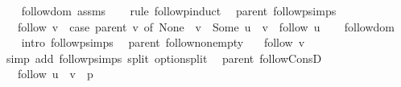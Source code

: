 \begin{isabellebody}
%
\isadelimproof
\ \ %
\endisadelimproof
%
\isatagproof
{}\isamarkupfalse%
\ follow{\isacharunderscore}{\kern0pt}dom\ assms\isanewline
\ \ \isamarkupfalse%
\ {\isacharparenleft}{\kern0pt}rule\ follow{\isachardot}{\kern0pt}pinduct{\isacharparenright}{\kern0pt}%
\endisatagproof
{\isafoldproof}%
%
\isadelimproof
\isanewline
%
\endisadelimproof
\isanewline
{}\isamarkupfalse%
\ {\isacharparenleft}{\kern0pt}\ parent{\isacharparenright}{\kern0pt}\ follow{\isacharunderscore}{\kern0pt}psimps{\isacharcolon}{\kern0pt}\isanewline
\ \ \ {\isachardoublequoteopen}follow\ v\ {\isacharequal}{\kern0pt}\ {\isacharparenleft}{\kern0pt}case\ parent\ v\ of\ None\ {\isasymRightarrow}\ {\isacharbrackleft}{\kern0pt}v{\isacharbrackright}{\kern0pt}\ {\isacharbar}{\kern0pt}\ Some\ u\ {\isasymRightarrow}\ v\ {\isacharhash}{\kern0pt}\ follow\ u{\isacharparenright}{\kern0pt}{\isachardoublequoteclose}\isanewline
%
\isadelimproof
\ \ %
\endisadelimproof
%
\isatagproof
{}\isamarkupfalse%
\ follow{\isacharunderscore}{\kern0pt}dom\isanewline
\ \ \isamarkupfalse%
\ {\isacharparenleft}{\kern0pt}intro\ follow{\isachardot}{\kern0pt}psimps{\isacharparenright}{\kern0pt}%
\endisatagproof
{\isafoldproof}%
%
\isadelimproof
%
\endisadelimproof
%
\isadelimdocument
%
\endisadelimdocument
%
\isatagdocument
%
\isamarkupsubsection{%
}
\isamarkuptrue%
%
\endisatagdocument
{\isafolddocument}%
%
\isadelimdocument
%
\endisadelimdocument
{}\isamarkupfalse%
\ {\isacharparenleft}{\kern0pt}\ parent{\isacharparenright}{\kern0pt}\ follow{\isacharunderscore}{\kern0pt}non{\isacharunderscore}{\kern0pt}empty{\isacharcolon}{\kern0pt}\isanewline
\ \ \ {\isachardoublequoteopen}follow\ v\ {\isasymnoteq}\ {\isacharbrackleft}{\kern0pt}{\isacharbrackright}{\kern0pt}{\isachardoublequoteclose}\isanewline
%
\isadelimproof
\ \ %
\endisadelimproof
%
\isatagproof
{}\isamarkupfalse%
\ {\isacharparenleft}{\kern0pt}simp\ add{\isacharcolon}{\kern0pt}\ follow{\isacharunderscore}{\kern0pt}psimps\ split{\isacharcolon}{\kern0pt}\ option{\isachardot}{\kern0pt}split{\isacharparenright}{\kern0pt}%
\endisatagproof
{\isafoldproof}%
%
\isadelimproof
\isanewline
%
\endisadelimproof
\isanewline
{}\isamarkupfalse%
\ {\isacharparenleft}{\kern0pt}\ parent{\isacharparenright}{\kern0pt}\ follow{\isacharunderscore}{\kern0pt}ConsD{\isacharcolon}{\kern0pt}\isanewline
\ \ \ {\isachardoublequoteopen}follow\ u\ {\isacharequal}{\kern0pt}\ v\ {\isacharhash}{\kern0pt}\ p{\isachardoublequoteclose}\isanewline

\end{isabellebody}
